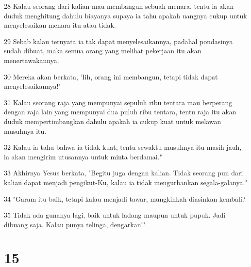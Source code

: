 \par 28 Kalau seorang dari kalian mau membangun sebuah menara, tentu ia akan duduk menghitung dahulu biayanya supaya ia tahu apakah uangnya cukup untuk menyelesaikan menara itu atau tidak.
\par 29 Sebab kalau ternyata ia tak dapat menyelesaikannya, padahal pondasinya sudah dibuat, maka semua orang yang melihat pekerjaan itu akan menertawakannya.
\par 30 Mereka akan berkata, 'Iih, orang ini membangun, tetapi tidak dapat menyelesaikannya!'
\par 31 Kalau seorang raja yang mempunyai sepuluh ribu tentara mau berperang dengan raja lain yang mempunyai dua puluh ribu tentara, tentu raja itu akan duduk mempertimbangkan dahulu apakah ia cukup kuat untuk melawan musuhnya itu.
\par 32 Kalau ia tahu bahwa ia tidak kuat, tentu sewaktu musuhnya itu masih jauh, ia akan mengirim utusannya untuk minta berdamai."
\par 33 Akhirnya Yesus berkata, "Begitu juga dengan kalian. Tidak seorang pun dari kalian dapat menjadi pengikut-Ku, kalau ia tidak mengurbankan segala-galanya."
\par 34 "Garam itu baik, tetapi kalau menjadi tawar, mungkinkah diasinkan kembali?
\par 35 Tidak ada gunanya lagi, baik untuk ladang maupun untuk pupuk. Jadi dibuang saja. Kalau punya telinga, dengarkan!"

\chapter{15}

